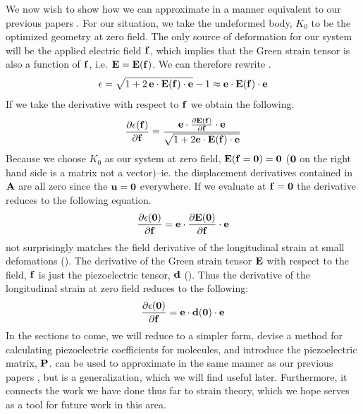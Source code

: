 We now wish to show how we can approximate \dtt in a manner equivalent to our previous papers \cite{Werling0,Werling1}.
For our situation, we take the undeformed body, $K_0$ to be the optimized geometry at zero field.  
The only source of deformation for our system will be the applied electric field ${{\mathbf f}}$, which implies that the Green strain tensor
is also a function of ${{\mathbf f}}$, i.e. ${\mathbf E} = {\mathbf E}({\mathbf f})$.  We can therefore rewrite .
\begin{equation} 
  \epsilon = \sqrt{1 + 2 \, {\mathbf e} \cdot {\mathbf E}({\mathbf f}) \cdot {\mathbf e}} - 1
                \approx {\mathbf e} \cdot {\mathbf E}({\mathbf f}) \cdot {\mathbf e}
\end{equation}
If we take the derivative with respect to ${\mathbf f}$ we obtain the following.
\begin{equation}
\label{eq:longstrainDeriv}
\frac{\partial \epsilon ({\bf{f}})}{\partial {\bf{f}}} = \frac{{\bf{e}}\cdot \frac{\partial {\bf{E}}({\bf{f}})}{\partial {\bf{f}}} \cdot {\bf{e}}}{\sqrt{ 1 + 2{\bf{e}}\cdot \bf{E(f)} \cdot \bf{e}}}
\end{equation}
Because we choose $K_0$ as our system at zero field, ${\mathbf E}({\mathbf f}={\mathbf 0})={\mathbf 0}$ (${\mathbf 0}$ on the right hand side is a matrix not a vector)--ie. the displacement derivatives contained
in ${\mathbf A}$ are all zero since the ${\mathbf u}={\mathbf 0}$ everywhere. 
If we evaluate  at ${\mathbf f}={\mathbf 0}$ the derivative reduces to the following equation.    
\begin{equation}
\label{eq:longstrainDeriv2}
\frac{\partial \epsilon ({\bf{0}})}{\partial {\bf{f}}} = {\bf{e}}\cdot \frac{\partial {\bf{E}}({\bf{0}})}{\partial {\bf{f}}} \cdot {\bf{e}}
\end{equation}
 not surprisingly matches the field derivative of the longitudinal strain at small defomations (). 
The derivative of the Green strain tensor ${\mathbf E}$ with respect to the field, ${\mathbf f}$ is just the piezoelectric tensor, ${\mathbf d}$ (). 
Thus the derivative of the longitudinal strain at zero field reduces to the following:
\begin{equation}
\label{eq:longstrainDeriv3}
\frac{\partial \epsilon ({\bf{0}})}{\partial {\bf{f}}} = {\bf{e}}\cdot {\mathbf d}({\bf{0}}) \cdot {\bf{e}}
\end{equation}
In the sections to come, we will reduce  to a simpler form, devise a method for calculating piezoelectric coefficients for molecules,
and introduce the piezoelectric matrix, ${\mathbf P}$.   can be used to approximate \dtt in the same manner as our previous papers \cite{Werling0,Werling1}, but is a generalization, which
we will find useful later.  Furthermore, it connects the work we have done thus far to strain theory, which we hope serves as a tool for future work in this area.  


